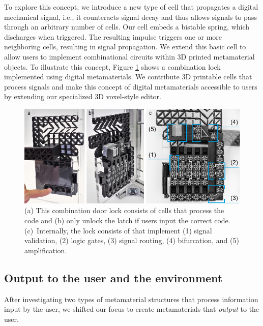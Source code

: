 To explore this concept, we introduce a new type of cell that propagates a digital mechanical signal, i.e., it counteracts signal decay and thus allows signals to pass through an arbitrary number of cells. Our cell embeds a bistable spring, which discharges when triggered. The resulting impulse triggers one or more neighboring cells, resulting in signal propagation. We extend this basic cell to allow users to implement combinational circuits within 3D printed metamaterial objects. To illustrate this concept, Figure \ref{fig:3-overview-digital-metamaterials} shows a combination lock implemented using digital metamaterials. We contribute 3D printable cells that process signals and make this concept of digital metamaterials accessible to users by extending our specialized 3D voxel-style editor.

\begin{figure} [h] %
    \centering
    \includegraphics[width=1\textwidth]{chapters/introduction-FIG/3-overview-digital-metamaterials.pdf}
    \caption[Short figure name.]{(a) This combination door lock consists of cells that process the code and (b) only unlock the latch if users input the correct code. (c)~Internally, the lock consists of that implement (1) signal validation, (2) logic gates, (3) signal routing, (4) bifurcation, and (5) amplification.
    \label{fig:3-overview-digital-metamaterials}}
\end{figure}


\subsection{Output to the user and the environment}

After investigating two types of metamaterial structures that process information input by the user, we shifted our focus to create metamaterials that \textit{output} to the user. 

